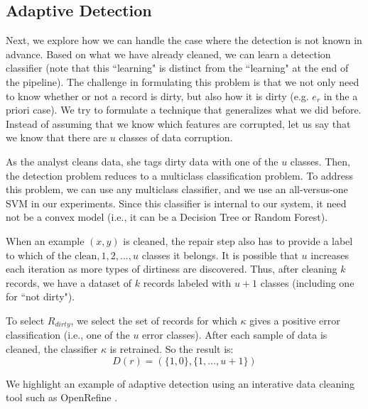 \subsection{Adaptive Detection}
Next, we explore how we can handle the case where the detection is not known in advance.
Based on what we have already cleaned, we can learn a detection classifier (note that this ``learning" is distinct from the ``learning" at the end of the pipeline).
The challenge in formulating this problem is that we not only need to know whether or not a record is dirty, but also how it is dirty (e.g. $e_r$ in the a priori case).
We try to formulate a technique that generalizes what we did before.
Instead of assuming that we know which features are corrupted, let us say that we know that there are $u$ classes of data corruption.

\begin{example}

\end{example}

As the analyst cleans data, she tags dirty data with one of the $u$ classes.
Then, the detection problem reduces to a multiclass classification problem.
To address this problem, we can use any multiclass classifier, and we use an all-versus-one SVM in our experiments.
Since this classifier is internal to our system, it need not be a convex model (i.e., it can be a Decision Tree or Random Forest).

When an example $(x,y)$ is cleaned, the repair step also has to provide a label to which of the ${\text{clean}, 1,2,...,u}$ classes it belongs. It is possible that $u$ increases each iteration as more types of dirtiness are discovered. 
Thus, after cleaning $k$ records, we have a dataset of $k$ records labeled with $u+1$ classes (including one for ``not dirty").

\begin{definition}
To select $R_{dirty}$, we select the set of records for which $\kappa$ gives a positive error classification (i.e., one of the $u$ error classes).
After each sample of data is cleaned, the classifier $\kappa$ is retrained.
So the result is:
\[D(r) = (\{1,0\},\{1,...,u+1\})\]
\end{definition}

We highlight an example of adaptive detection using an interative data cleaning tool such as OpenRefine \cite{openrefine}.

